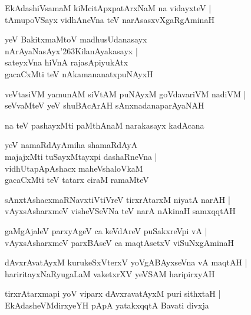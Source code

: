 \documentclass[twoside,12pt,openright]{book}
\def\S{\char'263}
\newcounter{shloka}[chapter]
\begin{document}
\begin{shloka}%
EkAdashiVsamaM kiMcitApxpatArxNaM na vidayxteV |\\
tAmupoVSayx vidhAneVna teV narAsasxvXgaRgAminaH 
\end{shloka}

\begin{shloka}%
yeV BakitxmaMtoV madhusUdanasayx \\
nArAyaNasAyx\S KilanAyakasayx |\\
sateyxVna hiVnA rajasApiyukAtx \\
gacaCxMti teV nAkamananatxpuNAyxH
\end{shloka}

\begin{shloka}%
veVtasiVM yamunAM siVtAM puNAyxM goVdavariVM nadiVM |\\
seVvaMteV yeV shuBAcArAH sAnxnadanaparAyaNAH 
\end{shloka}

\begin{shloka}%
na teV pashayxMti paMthAnaM narakasayx kadAcana 
\end{shloka}

\begin{shloka}%
yeV namaRdAyAmiha shamaRdAyA \\
majajxMti tuSayxMtayxpi dashaRneVna |\\
vidhUtapApAshacx maheVshaloVkaM \\
gacaCxMti teV tatarx ciraM ramaMteV
\end{shloka}

\begin{shloka}%
sAnxtAshacxmaRNavxtiVtiVreV tirxrAtarxM niyatA narAH |\\
vAyxsAsharxmeV visheVSeVNa teV narA nAkinaH samxqqtAH 
\end{shloka}

\begin{shloka}%
gaMgAjaleV parxyAgeV ca keVdAreV puSakxreVpi vA |\\
vAyxsAsharxmeV parxBAseV ca maqtAsetxV viSuNxgAminaH 
\end{shloka}

\begin{shloka}%
dAvxrAvatAyxM kurukeSxVterxV yoVgABAyxseVna vA maqtAH |\\
hariritayxNaRyugaLaM vaketxrXV yeVSAM haripirxyAH 
\end{shloka}

\begin{shloka}%
tirxrAtarxmapi yoV viparx dAvxravatAyxM puri sithxtaH |\\
EkAdasheVMdirxyeYH pApA yatakxqqtA Bavati divxja
\end{shloka}
\end{document}
